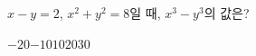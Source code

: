 $x-y=2$, $x^2+y^2=8$일 때, $x^3-y^3$의 값은?
\begin{choices32}{$-20$}{$-10$}{$10$}{$20$}{$30$}\end{choices32}
